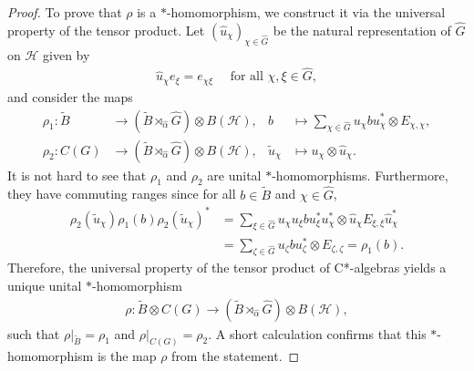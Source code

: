 \documentclass[10pt,a4paper]{amsart}
\begin{document}
\begin{proof}
    To prove that $\rho$ is a $\ast$-homomorphism, we construct it via the universal property of the tensor product.
    Let $(\hat{u}_\chi)_{\chi \in \hat{G}}$ be the natural representation of $\hat{G}$ on $\mathcal{H}$ given by 
    \begin{align*}
        \hat{u}_\chi e_\xi = e_{\chi \xi} \quad \text{ for all } \chi, \xi \in \hat{G},
    \end{align*}
    and consider the maps
    \begin{align*}
        \rho_1: \tilde{B} &\to \left(\tilde{B} \rtimes_{\hat{\alpha}} \hat{G}\right) \otimes B(\mathcal{H}), & b &\mapsto \sum_{\chi \in \hat{G}} u_\chi b u_\chi^\ast \otimes E_{\chi, \chi}, \\
        \rho_2: C(G) &\to \left(\tilde{B} \rtimes_{\hat{\alpha}} \hat{G}\right) \otimes B(\mathcal{H}), & \tilde{u}_\chi &\mapsto u_\chi \otimes \hat{u}_\chi.
    \end{align*}
    It is not hard to see that $\rho_1$ and $\rho_2$ are unital $\ast$-homomorphisms. Furthermore, they have commuting ranges since for all $b \in \tilde{B}$ and $\chi \in \hat{G}$,
    \begin{align*}
        \rho_2(\tilde{u}_\chi) \rho_1(b) \rho_2(\tilde{u}_\chi)^\ast 
            &= \sum_{\xi \in \hat{G}} u_\chi u_\xi b u_\xi^\ast u_\chi^\ast \otimes \hat{u}_\chi E_{\xi, \xi} \hat{u}_\chi^\ast \\
            &= \sum_{\zeta \in \hat{G}} u_\zeta b u_\zeta^\ast \otimes E_{\zeta, \zeta}
            = \rho_1(b).
    \end{align*}
    Therefore, the universal property of the tensor product of C*-algebras yields a unique unital $\ast$-homomorphism
    \begin{align*}
        \rho: \tilde{B} \otimes C(G) \to \left(\tilde{B} \rtimes_{\hat{\alpha}} \hat{G}\right) \otimes B(\mathcal{H}),
    \end{align*}
    such that $\rho|_{\tilde{B}} = \rho_1$ and $\rho|_{C(G)} = \rho_2$. A short calculation confirms that this $\ast$-homomorphism is the map $\rho$ from the statement.


\end{proof}
\end{document}
